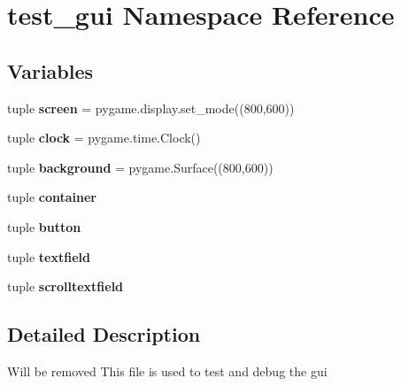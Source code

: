 \hypertarget{namespacetest__gui}{\section{test\-\_\-gui \-Namespace \-Reference}
\label{namespacetest__gui}
}
\subsection*{\-Variables}
\begin{DoxyCompactItemize}
\item 
\hypertarget{namespacetest__gui_aae28245559442c90bc153ae372942f95}{tuple {\bfseries screen} = pygame.\-display.\-set\-\_\-mode((800,600))}\label{namespacetest__gui_aae28245559442c90bc153ae372942f95}

\item 
\hypertarget{namespacetest__gui_afb2a815d64bafa2579936510b513741b}{tuple {\bfseries clock} = pygame.\-time.\-Clock()}\label{namespacetest__gui_afb2a815d64bafa2579936510b513741b}

\item 
\hypertarget{namespacetest__gui_a1cdfbcca09576bb1ecba2d7c4e3c351d}{tuple {\bfseries background} = pygame.\-Surface((800,600))}\label{namespacetest__gui_a1cdfbcca09576bb1ecba2d7c4e3c351d}

\item 
tuple {\bfseries container}
\item 
tuple {\bfseries button}
\item 
tuple {\bfseries textfield}
\item 
tuple {\bfseries scrolltextfield}
\end{DoxyCompactItemize}


\subsection{\-Detailed \-Description}
\begin{DoxyVerb}Will be removed
    This file is used to test and debug the gui\end{DoxyVerb}
 

